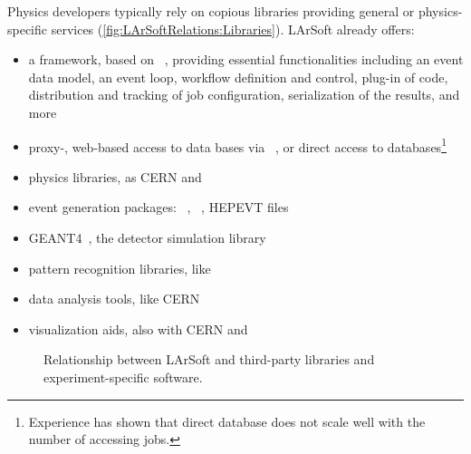 Physics developers typically rely on copious libraries providing general or physics-specific services
(\cref{fig:LArSoftRelations:Libraries}).
LArSoft already offers:
\begin{itemize}
	\item a framework, based on \ART~\cite{ART}, providing essential functionalities
		including an event data model, an event loop, workflow definition and control,
		plug-in of code, distribution and tracking of job configuration,
		serialization of the results, and more
	\item proxy-, web-based access to data bases via \libwda~\cite{libwda},
		or direct access to \PostgreSQL databases\footnote{%
		Experience has shown that direct database does not scale well with the number of accessing jobs.%
		}
	\item physics libraries, as CERN \CLHEP and \nutools~\cite{nutools}
	\item event generation packages: \GENIE~\cite{GENIE}, \CRY~\cite{CRY}, HEPEVT files
	\item GEANT4~\cite{GEANT}, the detector simulation library
	\item pattern recognition libraries, like \Pandora
	\item data analysis tools, like CERN \ROOT~\cite{ROOT}
	\item visualization aids, also with CERN \ROOT and \nutools
\end{itemize}
\begin{figure}
	\caption{\label{fig:LArSoftRelationsI}
		Relationship between LArSoft and \protect{} third-party libraries and \protect{} experiment-specific software.
	}
\end{figure}

